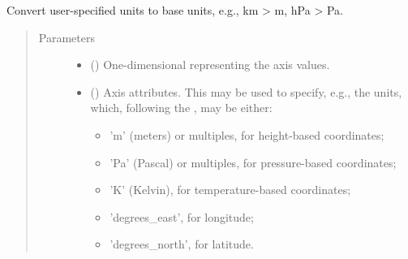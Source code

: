 \documentclass[letterpaper,10pt,english]{sphinxmanual}
\begin{document}
\begin{fulllineitems}
\begin{fulllineitems}
\begin{quote}
\begin{description}
\begin{itemize}
\begin{itemize}
\end{itemize}


\end{itemize}

\end{description}\end{quote}

\end{fulllineitems}


\begin{fulllineitems}
\label{\detokenize{api:tasmania.grids.axis.Axis._check_arguments}}
Convert user-specified units to base units, e.g., km \textendash{}\textgreater{} m, hPa \textendash{}\textgreater{} Pa.
\begin{quote}\begin{description}
\item[{Parameters}] \leavevmode\begin{itemize}
\item {} 
 () \textendash{} One-dimensional  representing the axis values.

\item {} 
 () \textendash{} 
Axis attributes. This may be used to specify, e.g., the units, which, following the
, may be either:
\begin{itemize}
\item {} 
’m’ (meters) or multiples, for height-based coordinates;

\item {} 
’Pa’ (Pascal) or multiples, for pressure-based coordinates;

\item {} 
’K’ (Kelvin), for temperature-based coordinates;

\item {} 
’degrees\_east’, for longitude;

\item {} 
’degrees\_north’, for latitude.

\end{itemize}



\end{itemize}
\end{description}
\end{quote}
\end{fulllineitems}
\end{fulllineitems}
\end{document}
